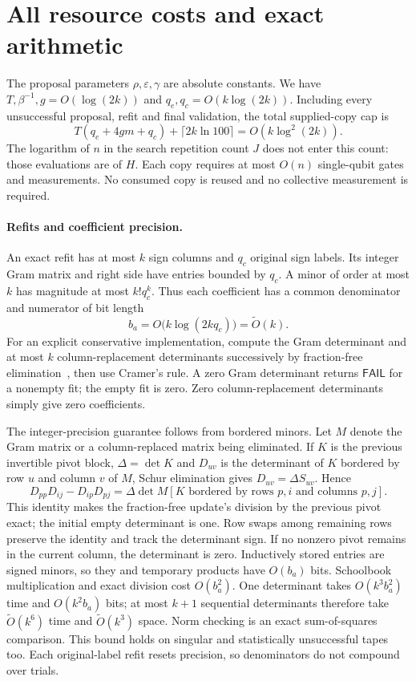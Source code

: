 \documentclass[11pt]{article}
\theoremstyle{remark}\newtheorem{remark}[theorem]{Remark}
\newcommand{\FAIL}{\mathsf{FAIL}}
\begin{document}
\section{All resource costs and exact arithmetic}\label{sec:costs}
The proposal parameters $\rho,\varepsilon,\gamma$ are absolute constants. We have $T,\beta^{-1},g=O(\log(2k))$ and $q_e,q_c=O(k\log(2k))$. Including every unsuccessful proposal, refit and final validation, the total supplied-copy cap is
\begin{equation}\label{eq:copies}
 T(q_e+4gm+q_c)+\lceil2k\ln100\rceil=O(k\log^2(2k)).
\end{equation}
The logarithm of $n$ in the search repetition count $J$ does not enter this count: those evaluations are of $H$. Each copy requires at most $O(n)$ single-qubit gates and measurements. No consumed copy is reused and no collective measurement is required.

\paragraph{Refits and coefficient precision.}
An exact refit has at most $k$ sign columns and $q_c$ original sign labels. Its integer Gram matrix and right side have entries bounded by $q_c$. A minor of order at most $k$ has magnitude at most $k!q_c^k$. Thus each coefficient has a common denominator and numerator of bit length
\[
 b_a=O\bigl(k\log(2kq_c)\bigr)=\widetilde O(k).
\]
For an explicit conservative implementation, compute the Gram determinant and at most $k$ column-replacement determinants successively by fraction-free elimination~\cite{Bareiss}, then use Cramer's rule. A zero Gram determinant returns $\FAIL$ for a nonempty fit; the empty fit is zero. Zero column-replacement determinants simply give zero coefficients.

The integer-precision guarantee follows from bordered minors. Let $M$ denote the Gram matrix or a column-replaced matrix being eliminated. If $K$ is the previous invertible pivot block, $\Delta=\det K$ and $D_{uv}$ is the determinant of $K$ bordered by row $u$ and column $v$ of $M$, Schur elimination gives $D_{uv}=\Delta S_{uv}$. Hence
\[
 D_{pp}D_{ij}-D_{ip}D_{pj}
 =\Delta\det M[K\text{ bordered by rows }p,i\text{ and columns }p,j].
\]
This identity makes the fraction-free update's division by the previous pivot exact; the initial empty determinant is one. Row swaps among remaining rows preserve the identity and track the determinant sign. If no nonzero pivot remains in the current column, the determinant is zero. Inductively stored entries are signed minors, so they and temporary products have $O(b_a)$ bits. Schoolbook multiplication and exact division cost $O(b_a^2)$. One determinant takes $O(k^3b_a^2)$ time and $O(k^2b_a)$ bits; at most $k+1$ sequential determinants therefore take $\widetilde O(k^6)$ time and $\widetilde O(k^3)$ space. Norm checking is an exact sum-of-squares comparison. This bound holds on singular and statistically unsuccessful tapes too. Each original-label refit resets precision, so denominators do not compound over trials.
\end{document}
